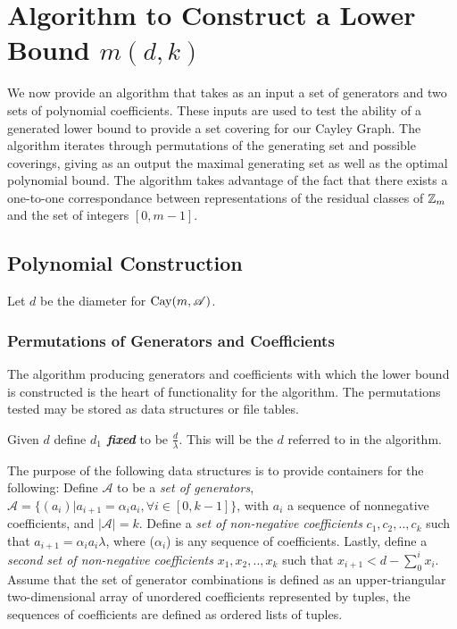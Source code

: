 \section{Algorithm to Construct a Lower Bound $m(d, k)$}

We now provide an algorithm that takes as an input a set of generators and two sets of polynomial coefficients. These inputs are used to test the ability of a generated lower bound to provide a set covering for our Cayley Graph. The algorithm iterates through permutations of the generating set and possible coverings, giving as an output the maximal generating set as well as the optimal polynomial bound. \n
The algorithm takes advantage of the fact that there exists a one-to-one correspondance between representations of the residual classes of $\mbox{$\mathbb Z$}_m$ and the set of integers $[0, m-1]$.\n

\subsection{Polynomial Construction}
\noindent
Let $d$ be the diameter for $\operatorname{Cay}(m, \mathscr{A})$.\n 

\subsubsection{Permutations of Generators and Coefficients}
The algorithm producing generators and coefficients with which the lower bound is constructed is the heart of functionality for the algorithm. \n
The permutations tested may be stored as data structures or file tables.

\noindent
Given $d$ define \emph{\bf{$d_{1}$ fixed}} to be $\frac{d}{\lambda}$. This will be the $d$ referred to in the algorithm.\n

The purpose of the following data structures is to provide containers for the following:\n
Define $\mathscr{A}$ to be a \emph{set of generators}, $\mathscr{A} = \{ (a_{i}) \vert a_{i+1} = \alpha_{i}a_{i},  \forall i \in [0, k-1] \} $, with $a_i$ a sequence of nonnegative coefficients, and $\vert \mathscr{A} \vert = k$.\n
Define a \emph{set of non-negative coefficients} $c_1, c_2, .. , c_k$ such that $a_{i+1} = \alpha_{i}a_{i} \lambda$, where ($\alpha_{i}$) is any sequence of coefficients.\n
Lastly, define a \emph{second set of non-negative coefficients} $x_1, x_2, .., x_{k}$ such that $x_{i+1} < d - \sum_{0}^{i}x_i$.
\noindent
Assume that the set of generator combinations is defined as an upper-triangular two-dimensional array of unordered coefficients represented by tuples, the sequences of coefficients are defined as ordered lists of tuples.

